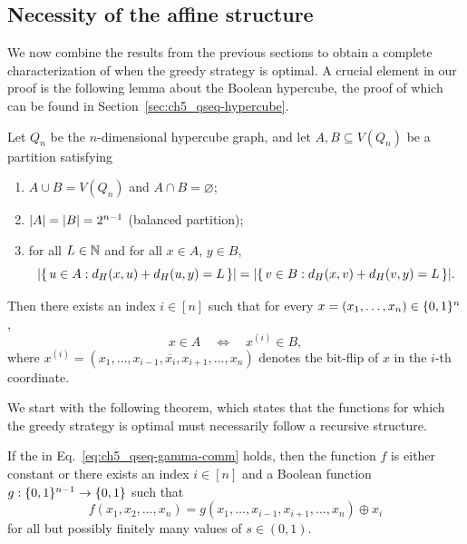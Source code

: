 \subsection{Necessity of the affine structure}

We now combine the results from the previous sections to obtain a complete characterization of when the greedy strategy is optimal.
A crucial element in our proof is the following lemma about the Boolean hypercube, the proof of which can be found in Section~\ref{sec:ch5_qseq-hypercube}.

\begin{lemma}\label{lem:ch5_qseq-hypercube-flip}
    Let $Q_n$ be the $n$-dimensional hypercube graph, and let $A, B \subseteq V(Q_n)$ be a partition satisfying
    \begin{enumerate}[label=(\roman*)]
        \item $A \cup B = V(Q_n)$ and $A \cap B = \varnothing$;
        \item $\abs{A} = \abs{B} = 2^{n-1}$ (balanced partition);
        \item\label{item:ch5_qseq-counting} for all $L \in \mathbb{N}$ and for all $x \in A$, $y \in B$,
        \begin{equation}\label{eq:ch5_qseq-count-condition}
            \abs{\{\,u \in A: d_H(x,u) + d_H(u,y) = L\,\}}
            =
            \abs{\{\,v \in B: d_H(x,v) + d_H(v,y) = L\,\}}.
        \end{equation}
    \end{enumerate}
    Then there exists an index $i \in [n]$ such that for every $x = (x_1,\ldots,x_n) \in \{ 0, 1 \}^n$,
    \begin{equation}
        x \in A \quad\Longleftrightarrow\quad x^{(i)} \in B,
    \end{equation}
    where $x^{(i)} = (x_1,\ldots,x_{i-1},\overline{x_i},x_{i+1},\ldots,x_n)$ denotes the bit-flip of $x$ in the $i$-th coordinate.
\end{lemma}
\theoremstyle{plain}
\newtheorem*{hypercubefliprestate}{Lemma~\ref{lem:ch5_qseq-hypercube-flip}}
We start with the following theorem, which states that the functions for which the greedy strategy is optimal must necessarily follow a recursive structure.
\begin{theorem}\label{thm:ch5_qseq-function-form}
    If the \gammacomm{} in Eq.~\eqref{eq:ch5_qseq-gamma-comm} holds, then the function $f$ is either constant or there exists an index $i \in [n]$ and a Boolean function $g : \{ 0, 1 \}^{n-1} \to \{ 0, 1 \}$ such that
    \begin{equation}\label{eq:ch5_qseq-function-xor}
        f(x_1,x_2,\ldots,x_n)
        =
        g(x_1,\ldots,x_{i-1},x_{i+1},\ldots,x_n) \oplus x_i
    \end{equation}
    for all but possibly finitely many values of $s \in (0,1)$.
\end{theorem}
